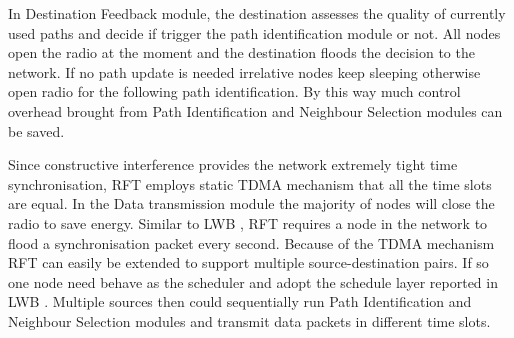 \documentclass[conference]{IEEEtran}
\begin{document}
In Destination Feedback module, the destination assesses the quality of currently used paths and decide if trigger the path identification module or not. All nodes open the radio at the moment and the destination floods the decision to the network. If no path update is needed irrelative nodes keep sleeping otherwise open radio for the following path identification. By this way much control overhead brought from Path Identification and Neighbour Selection modules can be saved.

Since constructive interference provides the network extremely tight time synchronisation, RFT employs static TDMA mechanism that all the time slots are equal. In the Data transmission module the majority of nodes will close the radio to save energy. Similar to LWB \cite{ferrari2012low}, RFT requires a node in the network to flood a synchronisation packet every second. Because of the TDMA mechanism RFT can easily be extended to support multiple source-destination pairs. If so one node need behave as the scheduler and adopt the schedule layer reported in LWB \cite{ferrari2012low}. Multiple sources then could sequentially run Path Identification and Neighbour Selection modules and transmit data packets in different time slots.

\end{document}
